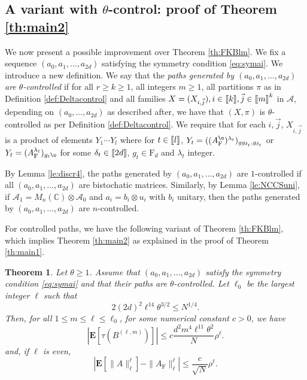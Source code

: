 \documentclass[11pt]{article}
\renewcommand{\star}{{\mathrm{F}}}
\newtheorem{theorem}[lemma]{Theorem}
\newcommand{\cA}{\mathcal{A}}
\newcommand{\dE}{\mathbf {E}}
\newcommand{\dF}{\mathrm{F}}
\newcommand{\dC}{\mathbb {C}}
\newcommand{\ABS}[1]{{{\left| #1 \right|}}} %
\newcommand{\SBRA}[1]{{{\left[#1\right]}}} %
\newcommand{\PAR}[1]{{{\left(#1\right)}}} %
\newcommand{\1}{1\!\!{\sf I}}
\newcommand{\INT}[1]{{{\left[\hspace{-1.4pt}\left[#1\right]\hspace{-1.4pt}\right]}}}
\begin{document}
\subsection{A variant with $\theta$-control: proof of Theorem \ref{th:main2}}

We now present a possible improvement over Theorem \ref{th:FKBlm}. 
We fix a sequence $(a_0,a_1, \ldots, a_{2d})$ satisfying the symmetry condition \eqref{eq:symai}. 
We introduce a new definition. We say that the  {\em paths generated by $(a_0,a_1, \ldots, a_{2d})$ are $\theta$-controlled} if for all $r \geq k \geq 1$, all integers $m \geq 1$, all partitions $\pi$ as in Definition \ref{def:Deltacontrol} and all families $X = (X_{i,\vec j}), i \in \INT{k}, \vec j \in \INT{m}^k$ in $\cA$, depending on $(a_0,\ldots,a_{2d})$ as described after, we have that $(X,\pi)$ is $\theta$-controlled as per Definition \ref{def:Deltacontrol}. We require that for each $i,\vec j$, $X_{i,\vec j}$ is a product of elements $Y_1\cdots Y_l$ where for $t \in \INT{l}$, $Y_t = ((A^{\o}_\star)^{\lambda_t} )_{g  g_{\delta_t} , g_{\delta_t}}$ or $Y_t = (A_{\star}^{\lambda_t})_{g_t \o}$ for some $\delta_t \in \INT{2d}$, $g_t \in \dF_d$ and $\lambda_t$ integer.

By Lemma \ref{le:discr4}, the paths generated by  $(a_0,a_1, \ldots, a_{2d})$ are $1$-controlled if all $(a_0,a_1, \ldots, a_{2d})$ are bistochatic matrices. Similarly, by Lemma \ref{le:NCCSuni}, if $\cA_1 = M_n(\dC) \otimes \cA_0$ and $a_i = b_i \otimes u_i$ with $b_i $ unitary, then  the paths generated by  $(a_0,a_1, \ldots, a_{2d})$ are $n$-controlled.

For controlled paths, we have the following variant of Theorem \ref{th:FKBlm}, which implies Theorem \ref{th:main2} as explained in the proof of Theorem \ref{th:main1}.

\begin{theorem}\label{th:FKBlmtheta}
Let $\theta \geq 1$. Assume that $(a_0,a_1,\ldots,a_{2d})$ satisfy  the symmetry condition \eqref{eq:symai} and that their paths are $\theta$-controlled. Let $\ell_0$ be the largest integer $\ell$ such that 
$$
2 (2d)^{2} \ell^{14} \theta^{3/2} \leq N^{1/4}. 
$$
Then, for all $1 \leq m \leq \ell \leq \ell_0$, for some numerical constant $c >0$, we have
$$
\ABS{ \dE \SBRA{\tau \PAR{ B^{(\ell,m)} } }}\leq c  \frac{d^2  m^{4} \ell^{11}  \theta^2 }{N} \rho^\ell.
$$
and, if $\ell$ is even,
$$
\ABS{ \dE \SBRA{\| A \|_\ell^\ell}  - \| A_\star \|_\ell^\ell } \leq   \frac{c}{\sqrt N}  \rho^{\ell}.
$$
\end{theorem}
\end{document}
